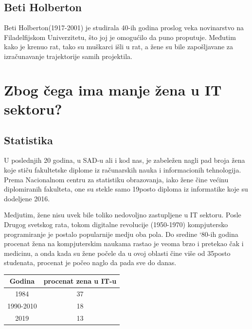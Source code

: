 \documentclass[a4paper,12pt]{article}
\begin{document}
\subsection{Beti Holberton}
\begin{flushleft}

Beti Holberton(1917-2001) je studirala 40-ih godina proslog veka novinarstvo na Filadelfijskom Univerzitetu, što joj je omogućilo da puno proputuje. Međutim kako je krenuo rat, tako su muškarci išli u rat, a žene su bile zapošljavane za izračunavanje trajektorije samih projektila.

\end{flushleft}


\section{Zbog čega ima manje žena u IT sektoru?}

\subsection{Statistika}
\begin{flushleft}
U poslednjih 20 godina, u SAD-u ali i kod nas, je zabeležen nagli pad broja žena koje stiču fakultetske diplome iz računarskih nauka i
informacionih tehnologija. Prema Nacionalnom centru za statistiku obrazovanja, iako žene čine većinu diplomiranih fakulteta, 
one su stekle samo 19posto diploma iz informatike koje su dodeljene 2016.

Medjutim, žene nisu uvek bile toliko nedovoljno zastupljene u IT sektoru. Posle Drugog svetskog rata, 
tokom digitalne revolucije (1950-1970) kompjutersko programiranje je postalo popularnije medju oba pola. 
Do sredine `80-ih godina procenat žena na kompjuterskim naukama rastao je veoma brzo i pretekao čak i medicinu, 
a onda kada su žene počele da u ovoj oblasti čine više od 35posto studenata, procenat je počeo naglo da pada sve do danas. 
\end{flushleft}


\begin{table}[h]
\centering
\begin{tabular}{c|c}
\toprule
Godina    & procenat zena u IT-u \\ 
\midrule
1984      & 37                   \\ 
1990-2010 & 18                   \\ 
2019      & 13                   \\ 
\bottomrule
\end{tabular}
\end{table}
\end{document}
